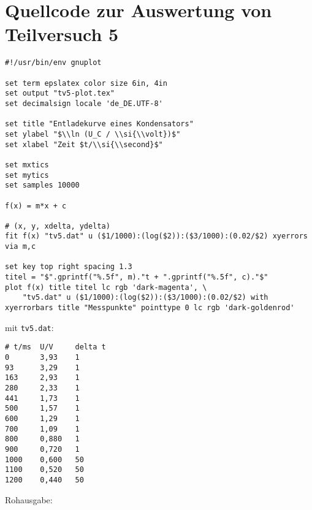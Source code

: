 \section{\gnuplot{} Quellcode zur Auswertung von Teilversuch 5}
    \label{appdx:gnuplottv5}
    {  
        \renewcommand{\fcolorbox}[4][]{#4}
        \begin{verbatim}
#!/usr/bin/env gnuplot

set term epslatex color size 6in, 4in
set output "tv5-plot.tex"
set decimalsign locale 'de_DE.UTF-8'

set title "Entladekurve eines Kondensators"
set ylabel "$\\ln (U_C / \\si{\\volt})$"
set xlabel "Zeit $t/\\si{\\second}$"

set mxtics
set mytics
set samples 10000

f(x) = m*x + c

# (x, y, xdelta, ydelta)
fit f(x) "tv5.dat" u ($1/1000):(log($2)):($3/1000):(0.02/$2) xyerrors via m,c

set key top right spacing 1.3
titel = "$".gprintf("%.5f", m)."t + ".gprintf("%.5f", c)."$"
plot f(x) title titel lc rgb 'dark-magenta', \
    "tv5.dat" u ($1/1000):(log($2)):($3/1000):(0.02/$2) with xyerrorbars title "Messpunkte" pointtype 0 lc rgb 'dark-goldenrod'
        \end{verbatim}
    }
    mit \texttt{tv5.dat}:
    \begin{multicols}{2}
        \begin{verbatim}
# t/ms  U/V     delta t
0       3,93    1
93      3,29    1
163     2,93    1
280     2,33    1
441     1,73    1
500     1,57    1
600     1,29    1
700     1,09    1
800     0,880   1
900     0,720   1
1000    0,600   50
1100    0,520   50
1200    0,440   50
        \end{verbatim}
    \end{multicols}
    \vspace{-\baselineskip}
    Rohausgabe:
